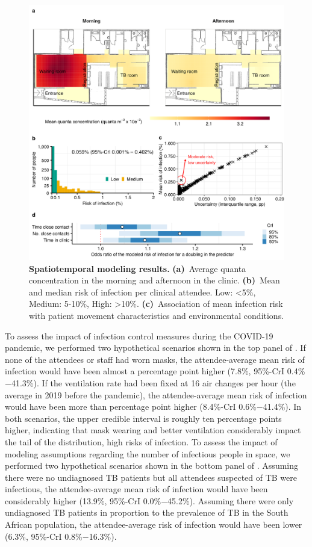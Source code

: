 \documentclass[fleqn,11pt]{wlscirep}
\begin{document}
\begin{figure}
    \centering
    \includegraphics{results/modeling/main-figure.png}
    \caption{\textbf{Spatiotemporal modeling results.} \textbf{(a)}~Average quanta concentration in the morning and afternoon in the clinic. \textbf{(b)}~Mean and median risk of infection per clinical attendee. Low: <5\%, Medium: 5-10\%, High: >10\%. \textbf{(c)}~Association of mean infection risk with patient movement characteristics and environmental conditions. }
    \label{fig:main-modeling-results}
\end{figure}

To assess the impact of infection control measures during the COVID-19 pandemic, we performed two hypothetical scenarios shown in the top panel of . If none of the attendees or staff had worn masks, the attendee-average mean risk of infection would have been almost a percentage point higher (7.8\%, 95\%-CrI 0.4\%$-$41.3\%). If the ventilation rate had been fixed at 16 air changes per hour (the average in 2019 before the pandemic), the attendee-average mean risk of infection would have been more than percentage point higher (8.4\%-CrI 0.6\%$-$41.4\%). In both scenarios, the upper credible interval is roughly ten percentage points higher, indicating that mask wearing and better ventilation considerably impact the tail of the distribution, \ie high risks of infection. To assess the impact of modeling assumptions regarding the number of infectious people in space, we performed two hypothetical scenarios shown in the bottom panel of . Assuming there were no undiagnosed TB patients but all attendees suspected of TB were infectious, the attendee-average mean risk of infection would have been considerably higher (13.9\%, 95\%-CrI 0.0\%$-$45.2\%). Assuming there were only undiagnosed TB patients in proportion to the prevalence of TB in the South African population, the attendee-average risk of infection would have been lower (6.3\%, 95\%-CrI 0.8\%$-$16.3\%).  
\end{document}
